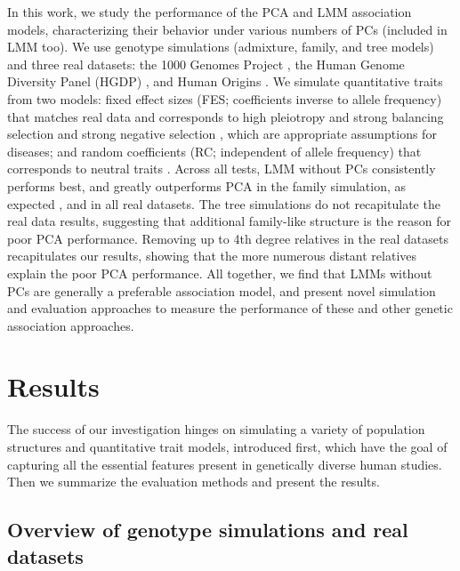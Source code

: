 \documentclass[11pt]{article}
\begin{document}
In this work, we study the performance of the PCA and LMM association models, characterizing their behavior under various numbers of PCs (included in LMM too).
We use genotype simulations (admixture, family, and tree models) and three real datasets: the 1000 Genomes Project \citep{the_1000_genomes_project_consortium_map_2010, 1000_genomes_project_consortium_integrated_2012}, the Human Genome Diversity Panel (HGDP) \citep{cann_human_2002, rosenberg_genetic_2002, bergstrom_insights_2020}, and Human Origins \citep{patterson_ancient_2012, lazaridis_ancient_2014, lazaridis_genomic_2016, skoglund_genomic_2016}.
We simulate quantitative traits from two models: fixed effect sizes (FES; coefficients inverse to allele frequency) that matches real data \citep{park_distribution_2011, zeng_signatures_2018, oconnor_extreme_2019} and corresponds to high pleiotropy and strong balancing selection \citep{simons_population_2018} and strong negative selection \citep{zeng_signatures_2018, oconnor_extreme_2019}, which are appropriate assumptions for diseases; and random coefficients (RC; independent of allele frequency) that corresponds to neutral traits \citep{zeng_signatures_2018, simons_population_2018}.
Across all tests, LMM without PCs consistently performs best, and greatly outperforms PCA in the family simulation, as expected \citep{patterson_population_2006, price_new_2010}, and in all real datasets.
The tree simulations do not recapitulate the real data results, suggesting that additional family-like structure is the reason for poor PCA performance.
Removing up to 4th degree relatives in the real datasets recapitulates our results, showing that the more numerous distant relatives explain the poor PCA performance.
All together, we find that LMMs without PCs are generally a preferable association model, and present novel simulation and evaluation approaches to measure the performance of these and other genetic association approaches.

\section{Results}

The success of our investigation hinges on simulating a variety of population structures and quantitative trait models, introduced first, which have the goal of capturing all the essential features present in genetically diverse human studies.
Then we summarize the evaluation methods and present the results.

\subsection{Overview of genotype simulations and real datasets}
\end{document}
